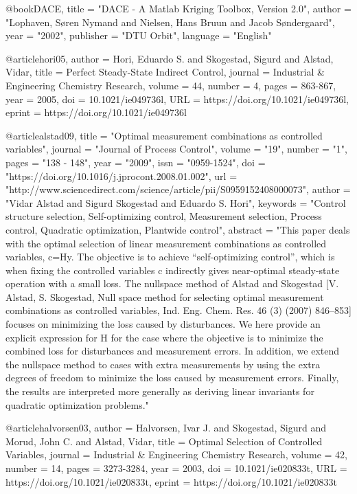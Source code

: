 @book{DACE,
title = "DACE - A Matlab Kriging Toolbox, Version 2.0",
author = "Lophaven, {S{\o}ren Nymand} and Nielsen, {Hans Bruun} and Jacob S{\o}ndergaard",
year = "2002",
publisher = "DTU Orbit",
language = "English"
}

@article{hori05,
author = {Hori, Eduardo S. and Skogestad, Sigurd and Alstad, Vidar},
title = {Perfect Steady-State Indirect Control},
journal = {Industrial \& Engineering Chemistry Research},
volume = {44},
number = {4},
pages = {863-867},
year = {2005},
doi = {10.1021/ie049736l},
URL = {https://doi.org/10.1021/ie049736l},
eprint = {https://doi.org/10.1021/ie049736l}
}

@article{alstad09,
title = "Optimal measurement combinations as controlled variables",
journal = "Journal of Process Control",
volume = "19",
number = "1",
pages = "138 - 148",
year = "2009",
issn = "0959-1524",
doi = "https://doi.org/10.1016/j.jprocont.2008.01.002",
url = "http://www.sciencedirect.com/science/article/pii/S0959152408000073",
author = "Vidar Alstad and Sigurd Skogestad and Eduardo S. Hori",
keywords = "Control structure selection, Self-optimizing control, Measurement selection, Process control, Quadratic optimization, Plantwide control",
abstract = "This paper deals with the optimal selection of linear measurement combinations as controlled variables, c=Hy. The objective is to achieve “self-optimizing control”, which is when fixing the controlled variables c indirectly gives near-optimal steady-state operation with a small loss. The nullspace method of Alstad and Skogestad [V. Alstad, S. Skogestad, Null space method for selecting optimal measurement combinations as controlled variables, Ind. Eng. Chem. Res. 46 (3) (2007) 846–853] focuses on minimizing the loss caused by disturbances. We here provide an explicit expression for H for the case where the objective is to minimize the combined loss for disturbances and measurement errors. In addition, we extend the nullspace method to cases with extra measurements by using the extra degrees of freedom to minimize the loss caused by measurement errors. Finally, the results are interpreted more generally as deriving linear invariants for quadratic optimization problems."
}

@article{halvorsen03,
author = {Halvorsen, Ivar J. and Skogestad, Sigurd and Morud, John C. and Alstad, Vidar},
title = {Optimal Selection of Controlled Variables},
journal = {Industrial \& Engineering Chemistry Research},
volume = {42},
number = {14},
pages = {3273-3284},
year = {2003},
doi = {10.1021/ie020833t},
URL = {https://doi.org/10.1021/ie020833t},
eprint = { 
        https://doi.org/10.1021/ie020833t}
}

